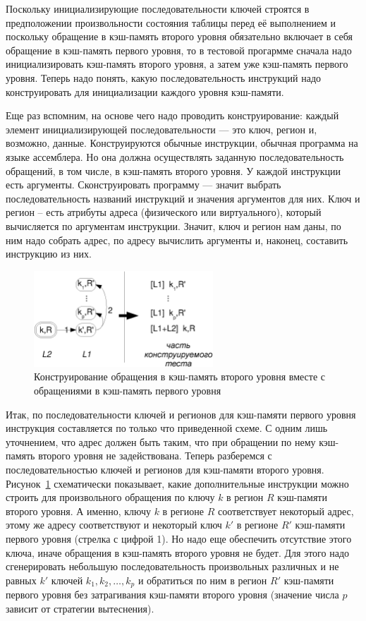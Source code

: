 \documentclass[14pt]{extreport}
\begin{document}
Поскольку инициализирующие последовательности ключей строятся в предположении произвольности состояния таблицы перед её выполнением и поскольку обращение в кэш-память второго уровня обязательно включает в себя обращение в кэш-память первого уровня, то в тестовой прогармме сначала надо инициализировать кэш-память второго уровня, а затем уже кэш-память первого уровня. Теперь надо понять, какую последовательность инструкций надо конструировать для инициализации каждого уровня кэш-памяти.

Еще раз вспомним, на основе чего надо проводить конструирование: каждый элемент инициализирующей последовательности --- это ключ, регион и, возможно, данные. Конструируются обычные инструкции, обычная программа на языке ассемблера. Но она должна осуществлять заданную последовательность обращений, в том числе, в кэш-память второго уровня. У каждой инструкции есть аргументы. Сконструировать программу --- значит выбрать последовательность названий инструкций и значения аргументов для них. Ключ и регион -- есть атрибуты адреса (физического или виртуального), который вычисляется по аргументам инструкции. Значит, ключ и регион нам даны, по ним надо собрать адрес, по адресу вычислить аргументы и, наконец, составить инструкцию из них.

\begin{figure}[h] \centering
\includegraphics[width=0.6\textwidth]{2.theor/L1L2}
\caption{Конструирование обращения в кэш-память второго уровня вместе с обращениями в кэш-память первого уровня}\label{fig:L1L2}
\end{figure}

Итак, по последовательности ключей и регионов для кэш-памяти первого уровня инструкция составляется по только что приведенной схеме. С одним лишь уточнением, что адрес должен быть таким, что при обращении по нему кэш-память второго уровня не задействована. Теперь разберемся с последовательностью ключей и регионов для кэш-памяти второго уровня. Рисунок~\ref{fig:L1L2} схематически показывает, какие дополнительные инструкции можно строить для произвольного обращения по ключу $k$ в регион $R$ кэш-памяти второго уровня. А именно, ключу $k$ в регионе $R$ соответствует некоторый адрес, этому же адресу соответствуют и некоторый ключ $k'$ в регионе $R'$ кэш-памяти первого уровня (стрелка с цифрой 1). Но надо еще обеспечить отсутствие этого ключа, иначе обращения в кэш-память второго уровня не будет. Для этого надо сгенерировать небольшую последовательность произвольных различных и не равных $k'$ ключей $k_1, k_2, \dots, k_p$ и обратиться по ним в регион $R'$ кэш-памяти первого уровня без затрагивания кэш-памяти второго уровня (значение числа $p$ зависит от стратегии вытеснения).
\end{document}
